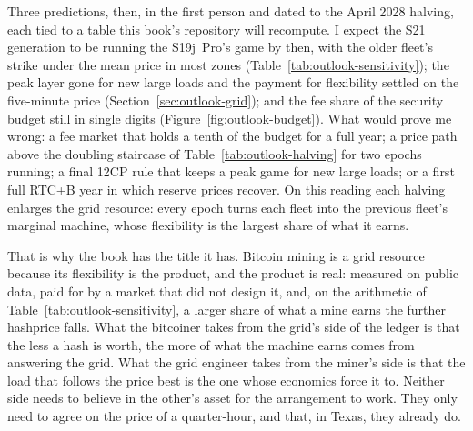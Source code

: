 Three predictions, then, in the first person and dated to the April 2028 halving, each tied to a table this book's repository will recompute. I expect the S21 generation to be running the S19j~Pro's game by then, with the older fleet's strike under the mean price in most zones (Table~\ref{tab:outlook-sensitivity}); the peak layer gone for new large loads and the payment for flexibility settled on the five-minute price (Section~\ref{sec:outlook-grid}); and the fee share of the security budget still in single digits (Figure~\ref{fig:outlook-budget}). What would prove me wrong: a fee market that holds a tenth of the budget for a full year; a price path above the doubling staircase of Table~\ref{tab:outlook-halving} for two epochs running; a final 12CP rule that keeps a peak game for new large loads; or a first full RTC+B year in which reserve prices recover. On this reading each halving enlarges the grid resource: every epoch turns each fleet into the previous fleet's marginal machine, whose flexibility is the largest share of what it earns.

That is why the book has the title it has. Bitcoin mining is a grid resource because its flexibility is the product, and the product is real: measured on public data, paid for by a market that did not design it, and, on the arithmetic of Table~\ref{tab:outlook-sensitivity}, a larger share of what a mine earns the further hashprice falls. What the bitcoiner takes from the grid's side of the ledger is that the less a hash is worth, the more of what the machine earns comes from answering the grid. %
What the grid engineer takes from the miner's side is that the load that follows the price best is the one whose economics force it to. Neither side needs to believe in the other's asset for the arrangement to work. They only need to agree on the price of a quarter-hour, and that, in Texas, they already do.
